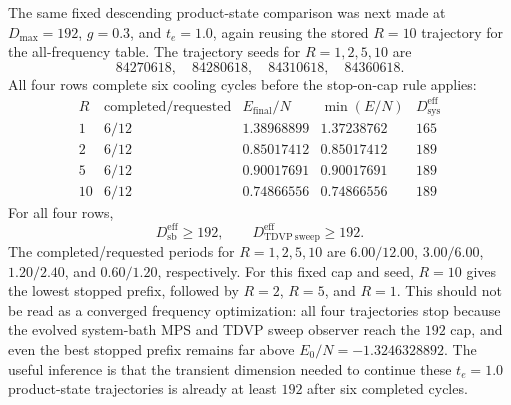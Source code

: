 \documentclass[aps,pra,twocolumn,superscriptaddress,nolongbibliography,nobalancelastpage,10pt]{revtex4-2}
\begin{document}
The same fixed descending product-state comparison was next made at
\(D_{\max}=192\), \(g=0.3\), and \(t_e=1.0\), again reusing the stored
\(R=10\) trajectory for the all-frequency table.  The trajectory seeds for
\(R=1,2,5,10\) are
\[
	84270618,\quad 84280618,\quad 84310618,\quad 84360618 .
\]
All four rows complete six cooling cycles before the stop-on-cap rule applies:
\[
\begin{array}{c|c|c|c|c}
R & \text{completed/requested} & E_{\mathrm{final}}/N
  & \min(E/N) & D_{\mathrm{sys}}^{\mathrm{eff}}\\
\hline
1 & 6/12 & 1.38968899 & 1.37238762 & 165\\
2 & 6/12 & 0.85017412 & 0.85017412 & 189\\
5 & 6/12 & 0.90017691 & 0.90017691 & 189\\
10 & 6/12 & 0.74866556 & 0.74866556 & 189
\end{array}
\]
For all four rows,
\[
	D_{\mathrm{sb}}^{\mathrm{eff}}\geq 192,\qquad
	D_{\mathrm{TDVP\ sweep}}^{\mathrm{eff}}\geq 192 .
\]
The completed/requested periods for \(R=1,2,5,10\) are
\(6.00/12.00\), \(3.00/6.00\), \(1.20/2.40\), and \(0.60/1.20\),
respectively.
For this fixed cap and seed, \(R=10\) gives the lowest stopped prefix, followed
by \(R=2\), \(R=5\), and \(R=1\).  This should not be read as a converged
frequency optimization: all four trajectories stop because the evolved
system-bath MPS and TDVP sweep observer reach the \(192\) cap, and even the best
stopped prefix remains far above \(E_0/N=-1.3246328892\).  The useful inference
is that the transient dimension needed to continue these \(t_e=1.0\)
product-state trajectories is already at least \(192\) after six completed
cycles.
\end{document}
